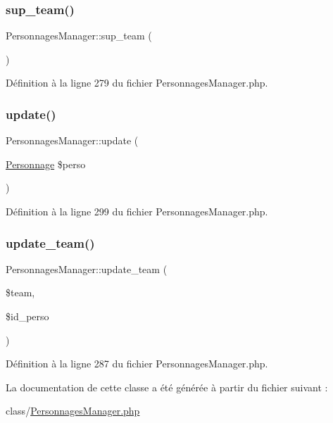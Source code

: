 \subsubsection{\texorpdfstring{sup\+\_\+team()}{sup\_team()}}
{\footnotesize\ttfamily Personnages\+Manager\+::sup\+\_\+team (\begin{DoxyParamCaption}{ }\end{DoxyParamCaption})}



Définition à la ligne 279 du fichier Personnages\+Manager.\+php.

\mbox{\label{class_personnages_manager_a21d75e552a085ee6178544d71f72b31c}} 
\subsubsection{\texorpdfstring{update()}{update()}}
{\footnotesize\ttfamily Personnages\+Manager\+::update (\begin{DoxyParamCaption}\item[{\mbox{\hyperlink{class_personnage}{Personnage}}}]{\$perso }\end{DoxyParamCaption})}



Définition à la ligne 299 du fichier Personnages\+Manager.\+php.

\mbox{\label{class_personnages_manager_a1847a27412e7325761f5866f584e3b22}} 
\subsubsection{\texorpdfstring{update\+\_\+team()}{update\_team()}}
{\footnotesize\ttfamily Personnages\+Manager\+::update\+\_\+team (\begin{DoxyParamCaption}\item[{}]{\$team,  }\item[{}]{\$id\+\_\+perso }\end{DoxyParamCaption})}



Définition à la ligne 287 du fichier Personnages\+Manager.\+php.



La documentation de cette classe a été générée à partir du fichier suivant \+:\begin{DoxyCompactItemize}
\item 
class/\mbox{\hyperlink{_personnages_manager_8php}{Personnages\+Manager.\+php}}\end{DoxyCompactItemize}
